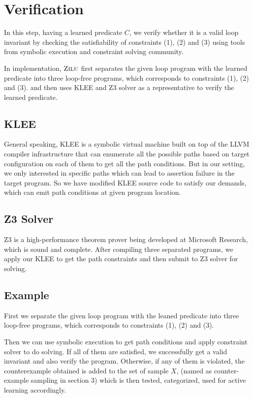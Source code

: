 
\section{Verification} %
\label{sec:verification}

In this step, having a learned predicate $C$, we verify whether it is a valid loop invariant by
checking the satisfiability of constraints (1), (2) and (3) using tools from symbolic execution and constraint solving community.

In implementation, $\textsc{Zilu}$ first separates the given loop program with the learned predicate into three loop-free programs,
which corresponds to constraints (1), (2) and (3).
and then uses KLEE and Z3 solver as a representative to verify the learned predicate.

\subsection{KLEE}
General speaking, KLEE is a symbolic virtual machine built on top of the LLVM compiler infrastructure
that can enumerate all the possible paths based on target configuration on each of them to get all the path conditions.
But in our setting, we only interested in specific paths which can lead to assertion failure in the target program. 
So we have modified KLEE source code to satisfy our demands, which can emit path conditions at given program location.

\subsection{Z3 Solver}
Z3 is a high-performance theorem prover being developed at Microsoft Research, which is sound and complete.
After compiling three separated programs, we apply our KLEE to get the path constraints and then submit to Z3 solver for solving.

\subsection{Example}
First we separate the given loop program with the leaned predicate into three loop-free programs,
which corresponds to constraints (1), (2) and (3). 

Then we can use symbolic execution to get path conditions and apply constraint solver to do solving.
If all of them are satisfied, we successfully get a valid invariant and also verify the program. 
Otherwise, if any of them is violated, the counterexample obtained is added to the set of sample $X$, (named as counter-example sampling in section 3)
which is then tested, categorized, used for active learning accordingly.




